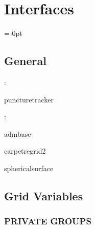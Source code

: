 
\section{Interfaces} 


\parskip = 0pt

\vspace{3mm} \subsection*{General}

: 

puncturetracker
\vspace{2mm}

: 

admbase

carpetregrid2

sphericalsurface
\vspace{2mm}
\subsection*{Grid Variables}
\vspace{5mm}\subsubsection{PRIVATE GROUPS}

\vspace{5mm}

